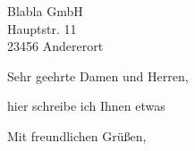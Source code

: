\documentclass[fontsize=12pt, paper=a4, version=last]{scrlttr2}
\begin{document}
\begin{letter}{Blabla GmbH\\ Hauptstr. 11\\ 23456 Andererort} %

\opening{Sehr geehrte Damen und Herren,}  %

hier schreibe ich Ihnen etwas %

\closing{Mit freundlichen Grüßen,} %

\end{letter}
\end{document}
